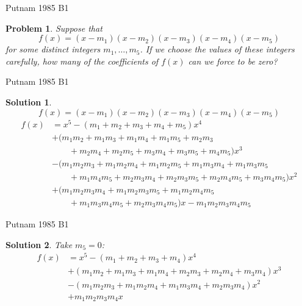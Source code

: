 \documentclass{beamer}
\newtheorem{prob}{Problem}
\newtheorem{soln}{Solution}
\begin{document}
\begin{frame}{Putnam 1985 B1}
\begin{prob}
Suppose that
$$f(x) = (x-m_1)(x-m_2)(x-m_3)(x-m_4)(x-m_5)$$
for some distinct integers $m_1,\dots, m_5$.
If we choose the values of these integers carefully, how many of the coefficients of $f(x)$ can we force to be zero?
\end{prob}
\pause
\end{frame}

\begin{frame}{Putnam 1985 B1}
\begin{soln}
$$f(x) = (x-m_1)(x-m_2)(x-m_3)(x-m_4)(x-m_5)$$
\pause
{\small
\begin{align*}
f(x)
  &= x^5-(m_1+m_2+m_3+m_4+m_5)x^4\\
  &+ (m_1m_2 + m_1m_3 + m_1m_4 + m_1m_5 + m_2m_3\\
  &\quad\quad + m_2m_4 + m_2m_5 + m_3m_4 + m_3m_5 + m_4m_5)x^3\\
  &- (m_1m_2m_3 + m_1m_2m_4 + m_1m_2m_5 + m_1m_3m_4 + m_1m_3m_5 \\
  &\quad\quad + m_1m_4m_5 + m_2m_3m_4 + m_2m_3m_5 + m_2m_4m_5 + m_3m_4m_5)x^2\\
  &+ (m_1m_2m_3m_4 + m_1m_2m_3m_5 + m_1m_2m_4m_5\\
  &\quad\quad + m_1m_3m_4m_5 + m_2m_3m_4m_5)x - m_1m_2m_3m_4m_5
\end{align*}
}
\end{soln}
\end{frame}

\begin{frame}{Putnam 1985 B1}
\begin{soln}
Take $m_5 = 0$: 
{\small
\begin{align*}
f(x)
  &= x^5-(m_1+m_2+m_3+m_4)x^4\\
  &+ (m_1m_2 + m_1m_3 + m_1m_4  + m_2m_3 + m_2m_4 + m_3m_4)x^3\\
  &- (m_1m_2m_3 + m_1m_2m_4 + m_1m_3m_4  +  m_2m_3m_4)x^2\\
  & + m_1m_2m_3m_4x
\end{align*}
}
\end{soln}
\end{frame}
\end{document}
